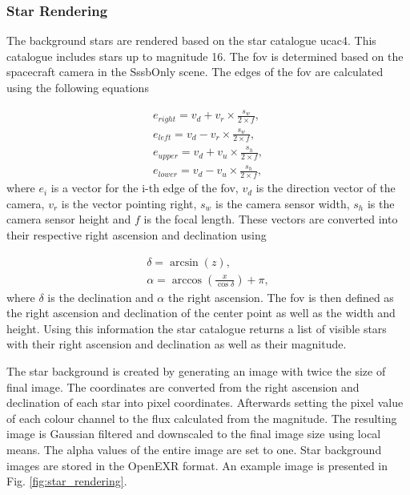 \subsubsection{Star Rendering} \label{sec:stars}
The background stars are rendered based on the star catalogue \gls{ucac4}. This catalogue includes stars up to magnitude 16. The \gls{fov} is determined based on the spacecraft camera in the SssbOnly scene. The edges of the \gls{fov} are calculated using the following equations

\begin{align}
    e_{right} = v_d + v_r \times \frac{s_w}{2 \times f}, \label{eq:edge_right} \\
    e_{left} = v_d - v_r \times \frac{s_w}{2 \times f}, \label{eq:edge_left} \\
    e_{upper} = v_d + v_u \times \frac{s_h}{2 \times f}, \label{eq:edge_upper} \\
    e_{lower} = v_d - v_u \times \frac{s_h}{2 \times f}, \label{eq:edge_lower}
\end{align}
where $e_{i}$ is a vector for the i-th edge of the \gls{fov}, $v_d$ is the direction vector of the camera, $v_r$ is the vector pointing right, $s_w$ is the camera sensor width, $s_h$ is the camera sensor height and $f$ is the focal length. These vectors are converted into their respective right ascension and declination using

\begin{align}
    \delta = \arcsin{(z)}, \label{eq:declination} \\
    \alpha = \arccos{\left(\frac{x}{\cos{\delta}}\right)} + \pi, \label{eq:right_ascension}
\end{align}
where $\delta$ is the declination and $\alpha$ the right ascension. The \gls{fov} is then defined as the right ascension and declination of the center point as well as the width and height. Using this information the star catalogue returns a list of visible stars with their right ascension and declination as well as their magnitude.

The star background is created by generating an image with twice the size of final image. The coordinates are converted from the right ascension and declination of each star into pixel coordinates. Afterwards setting the pixel value of each colour channel to the flux calculated from the magnitude. The resulting image is Gaussian filtered and downscaled to the final image size using local means. The alpha values of the entire image are set to one. Star background images are stored in the OpenEXR format. An example image is presented in Fig. \ref{fig:star_rendering}.

